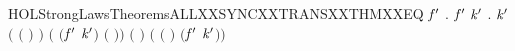 \newcommand{\HOLStrongLawsTheoremsALLXXSYNCXXTRANSXXTHM}{\UseVerbatim{HOLStrongLawsTheoremsALLXXSYNCXXTRANSXXTHM}}
\begin{SaveVerbatim}{HOLStrongLawsTheoremsALLXXSYNCXXTRANSXXTHMXXEQ}
\HOLTokenTurnstile{} \HOLSymConst{\HOLTokenForall{}}   \ensuremath{\HOLBoundVar{f}\sp{\prime{}}}  .
        \ensuremath{\HOLBoundVar{f}\sp{\prime{}}}  \HOLTokenTransBegin{}\HOLTokenTransEnd {} \HOLSymConst{\HOLTokenEquiv{}}
     \HOLSymConst{\HOLTokenExists{}} \ensuremath{\HOLBoundVar{k}\sp{\prime{}}} .
        \HOLSymConst{\HOLTokenLeq{}}  \HOLSymConst{\HOLTokenConj{}} \ensuremath{\HOLBoundVar{k}\sp{\prime{}}} \HOLSymConst{\HOLTokenLeq{}}  \HOLSymConst{\HOLTokenConj{}} \ensuremath{(} \ensuremath{(} \ensuremath{)} \HOLSymConst{\ensuremath{=}}  \ensuremath{)} \HOLSymConst{\HOLTokenConj{}}
       \ensuremath{(} \ensuremath{(}\ensuremath{\HOLBoundVar{f}\sp{\prime{}}} \ensuremath{\HOLBoundVar{k}\sp{\prime{}}}\ensuremath{)} \HOLSymConst{\ensuremath{=}}  \ensuremath{(} \ensuremath{)}\ensuremath{)} \HOLSymConst{\HOLTokenConj{}} \ensuremath{(} \HOLSymConst{\ensuremath{=}} \HOLConst{\ensuremath{\tau}}\ensuremath{)} \HOLSymConst{\HOLTokenConj{}}
       \ensuremath{(} \HOLSymConst{\ensuremath{=}}  \ensuremath{(} \ensuremath{)} \HOLSymConst{\ensuremath{\mid}}  \ensuremath{(}\ensuremath{\HOLBoundVar{f}\sp{\prime{}}} \ensuremath{\HOLBoundVar{k}\sp{\prime{}}}\ensuremath{)}\ensuremath{)}
\end{SaveVerbatim}
\newcommand{\HOLStrongLawsTheoremsALLXXSYNCXXTRANSXXTHMXXEQ}{\UseVerbatim{HOLStrongLawsTheoremsALLXXSYNCXXTRANSXXTHMXXEQ}}

